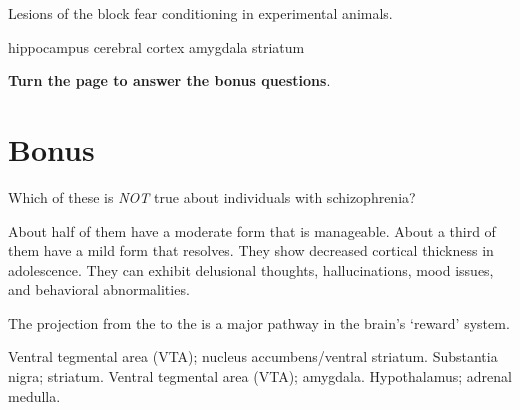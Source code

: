 \documentclass[answers]{exam}
\begin{document}
\begin{questions}

\question Lesions of the \fillin block fear conditioning in experimental animals.
\begin{choices}
\choice hippocampus
\choice cerebral cortex
\correctchoice amygdala
\choice striatum
\end{choices}

\vspace{2in}
\begin{center}
\textbf{Turn the page to answer the bonus questions}.
\end{center}

\newpage
\section{Bonus}


\question Which of these is \emph{NOT} true about individuals with schizophrenia?
\begin{choices}
\correctchoice About half of them have a moderate form that is manageable.
\choice About a third of them have a mild form that resolves.
\choice They show decreased cortical thickness in adolescence.
\choice They can exhibit delusional thoughts, hallucinations, mood issues, and behavioral abnormalities.
\end{choices}

\question The projection from the \fillin to the \fillin is a major pathway in the brain's `reward' system.
\begin{choices}
\correctchoice Ventral tegmental area (VTA); nucleus accumbens/ventral striatum.
\choice Substantia nigra; striatum.
\choice Ventral tegmental area (VTA); amygdala.
\choice Hypothalamus; adrenal medulla.
\end{choices}


\end{questions}
\end{document}
